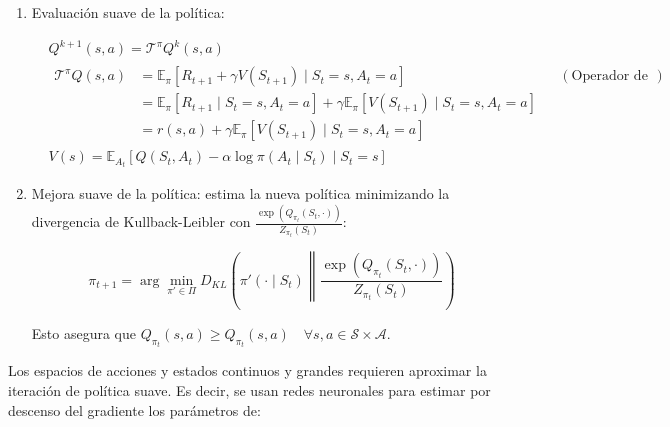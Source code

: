 \documentclass[11pt,a4paper]{article}
\begin{document}
		\begin{enumerate}
			\item Evaluación suave de la política:
			
			\begin{align}
			& Q^{k+1}(s, a) = \mathcal{T}^\pi Q^k(s, a) \\
			& \begin{aligned}
			\mathcal{T}^\pi Q(s, a) &= \mathbb{E}_\pi \left[ R_{t+1} + \gamma V(S_{t+1}) \mid S_t = s, A_t = a \right] && (\text{Operador de Bellman}) \\
			&= \mathbb{E}_\pi \left[ R_{t+1} \mid S_t = s, A_t = a \right] + \gamma \mathbb{E}_\pi \left[ V(S_{t+1}) \mid S_t = s, A_t = a \right] \\
			&= r(s,a) + \gamma \mathbb{E}_\pi \left[ V(S_{t+1}) \mid S_t = s, A_t = a \right]
			\end{aligned} \\
			& V(s) = \mathbb{E}_{A_t} \left[ Q(S_t, A_t) - \alpha \log \pi(A_t \mid S_t) \mid S_t = s \right] \label{eq:estado_valor_obj}
			\end{align}
			
			\item Mejora suave de la política: estima la nueva política minimizando la divergencia de Kullback-Leibler con $\frac{\exp(Q_{\pi_t}(S_t, \cdot))}{Z_{\pi_t}(S_t)}$:
			
			\begin{equation}
			\pi_{t+1} = \arg\min_{\pi' \in \Pi} D_{KL} \left( \pi'(\cdot \mid S_t) \middle\| \frac{\exp(Q_{\pi_t}(S_t, \cdot))}{Z_{\pi_t}(S_t)} \right)
			\end{equation}
			
			Esto asegura que $Q_{\pi_{t}}(s, a) \ge Q_{\pi_{t}}(s, a) \quad \forall s, a \in \mathcal{S} \times \mathcal{A}$.
			
		\end{enumerate}
		
		Los espacios de acciones y estados continuos y grandes requieren aproximar la iteración de política suave. Es decir, se usan redes neuronales para estimar por descenso del gradiente los parámetros de:
		
\end{document}
